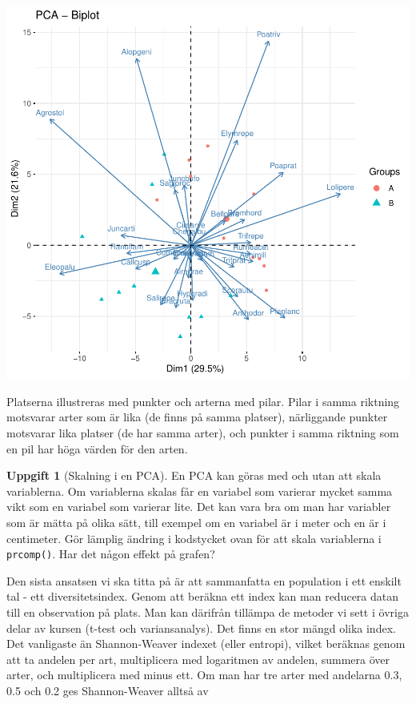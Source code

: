 \documentclass[
]{book}
\theoremstyle{definition}
\theoremstyle{definition}
\theoremstyle{definition}
\newtheorem{exercise}{Uppgift}[chapter]
\theoremstyle{definition}
\theoremstyle{remark}
\begin{document}
\begin{center}\includegraphics{R-anvisningar_files/figure-latex/unnamed-chunk-255-1} \end{center}

Platserna illustreras med punkter och arterna med pilar. Pilar i samma riktning motsvarar arter som är lika (de finns på samma platser), närliggande punkter motsvarar lika platser (de har samma arter), och punkter i samma riktning som en pil har höga värden för den arten.

\begin{exercise}[Skalning i en PCA]
En PCA kan göras med och utan att skala variablerna. Om variablerna skalas får en variabel som varierar mycket samma vikt som en variabel som varierar lite. Det kan vara bra om man har variabler som är mätta på olika sätt, till exempel om en variabel är i meter och en är i centimeter. Gör lämplig ändring i kodstycket ovan för att skala variablerna i \texttt{prcomp()}. Har det någon effekt på grafen?
\end{exercise}

Den sista ansatsen vi ska titta på är att sammanfatta en population i ett enskilt tal - ett diversitetsindex. Genom att beräkna ett index kan man reducera datan till en observation på plats. Man kan därifrån tillämpa de metoder vi sett i övriga delar av kursen (t-test och variansanalys). Det finns en stor mängd olika index. Det vanligaste än Shannon-Weaver indexet (eller entropi), vilket beräknas genom att ta andelen per art, multiplicera med logaritmen av andelen, summera över arter, och multiplicera med minus ett. Om man har tre arter med andelarna 0.3, 0.5 och 0.2 ges Shannon-Weaver alltså av
\end{document}
